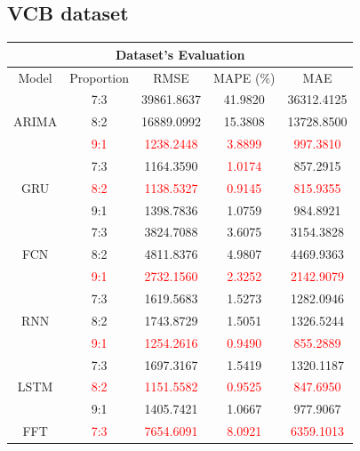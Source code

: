 \documentclass{ieeeojies}
\begin{document}
\subsection{VCB dataset} 
\begin{table}[H]
    \centering
    \begin{tabular}{|c|c|c|c|c|}
         \hline
         \multicolumn{5}{|c|}{\textbf{Dataset's Evaluation}}\\
         \hline
         \centering Model & Proportion & RMSE & MAPE (\%) & MAE\\
         \hline
        \multirow{3}{*}{ARIMA} 
        & 7:3 & 39861.8637 & 41.9820 & 36312.4125 \\
        & 8:2 & 16889.0992 & 15.3808 & 13728.8500 \\
        & \textcolor{red}{9:1} & \textcolor{red}{1238.2448} & \textcolor{red}{3.8899} & \textcolor{red}{997.3810} \\
        \hline
        \multirow{3}{*}{GRU} 
        & 7:3 & 1164.3590 & \textcolor{red}{1.0174} & 857.2915 \\
        & \textcolor{red}{8:2} & \textcolor{red}{1138.5327} & \textcolor{red}{0.9145} & \textcolor{red}{815.9355} \\
        & 9:1 & 1398.7836 & 1.0759 & 984.8921 \\
        \hline
        \multirow{3}{*}{FCN} 
        & 7:3 & 3824.7088 & 3.6075 & 3154.3828 \\
        & 8:2 & 4811.8376 & 4.9807 & 4469.9363 \\
        & \textcolor{red}{9:1} & \textcolor{red}{2732.1560} & \textcolor{red}{2.3252} & \textcolor{red}{2142.9079} \\
        \hline
        \multirow{3}{*}{RNN} 
        & 7:3 & 1619.5683 & 1.5273 & 1282.0946 \\
        & 8:2 & 1743.8729 & 1.5051 & 1326.5244 \\
        & \textcolor{red}{9:1} & \textcolor{red}{1254.2616} & \textcolor{red}{0.9490} & \textcolor{red}{855.2889} \\
        \hline
        \multirow{3}{*}{LSTM} 
        & 7:3 & 1697.3167 & 1.5419 & 1320.1187 \\
        & \textcolor{red}{8:2} & \textcolor{red}{1151.5582} & \textcolor{red}{0.9525} & \textcolor{red}{847.6950} \\
        & 9:1 & 1405.7421 & 1.0667 & 977.9067 \\
        \hline
        \multirow{3}{*}{FFT} 
        & \textcolor{red}{7:3} & \textcolor{red}{7654.6091} & \textcolor{red}{8.0921} & \textcolor{red}{6359.1013} \\
    

\end{tabular}
\end{table}
\end{document}
